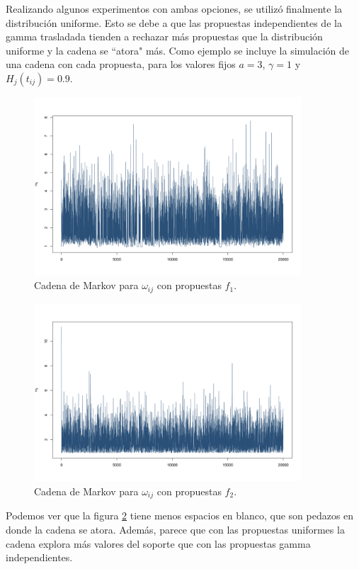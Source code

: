 \documentclass[11pt,a4paper]{article}
\begin{document}
Realizando algunos experimentos con ambas opciones, se utilizó finalmente la distribución uniforme. Esto se debe a que las propuestas independientes de la gamma trasladada tienden a rechazar más propuestas que la distribución uniforme y la cadena se ``atora" más. Como ejemplo se incluye la simulación de una cadena con cada propuesta, para los valores fijos $a = 3$, $\gamma = 1$ y $H_j(t_{ij}) = 0.9$.\\

\begin{figure}[H] 
\centering\includegraphics[width=10cm]{propuesta_gamma.png}
\caption{Cadena de Markov para $\omega_{ij}$ con propuestas $f_1$.}
\label{fig:prop_gamma}
\end{figure}

\begin{figure}[H] 
\centering\includegraphics[width=10cm]{propuesta_uniforme.png}
\caption{Cadena de Markov para $\omega_{ij}$ con propuestas $f_2$.}
\label{fig:prop_unif}
\end{figure}

Podemos ver que la figura \ref{fig:prop_unif} tiene menos espacios en blanco, que son pedazos en donde la cadena se atora. Además, parece que con las propuestas uniformes la cadena explora más valores del soporte que con las propuestas gamma independientes.\\
\end{document}
